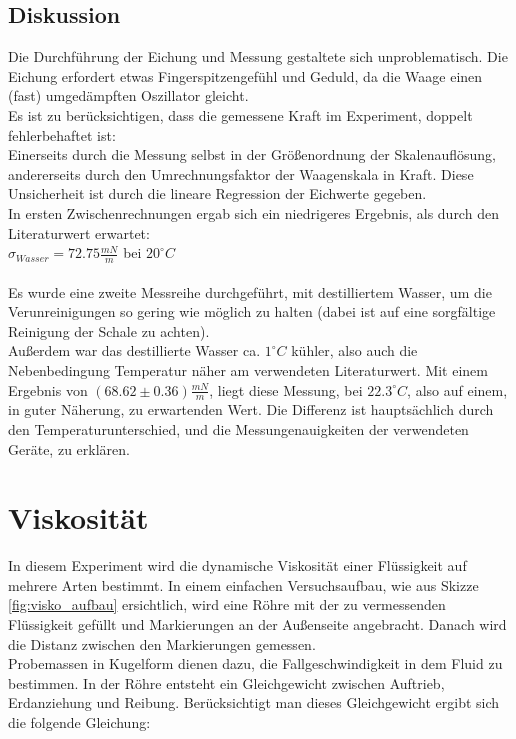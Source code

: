 \documentclass[12pt,a4paper]{article}
\begin{document}
\begin{multicols}{2}
\subsection{Diskussion}
Die Durchführung der Eichung und Messung gestaltete sich unproblematisch. Die Eichung erfordert etwas Fingerspitzengefühl und Geduld, da die Waage einen (fast) umgedämpften Oszillator gleicht.\\
Es ist zu berücksichtigen, dass die gemessene Kraft im Experiment, doppelt fehlerbehaftet ist:\\
Einerseits durch die Messung selbst in der Größenordnung der Skalenauflösung, andererseits durch den Umrechnungsfaktor der Waagenskala in Kraft. Diese Unsicherheit ist durch die lineare Regression der Eichwerte gegeben.\\



In ersten Zwischenrechnungen ergab sich ein niedrigeres Ergebnis, als durch den Literaturwert erwartet:\\
$\sigma_{Wasser} = 72.75 \frac{mN}{m}$ bei $20^{\circ}C$\\
\\
Es wurde eine zweite Messreihe durchgeführt, mit destilliertem Wasser, um die Verunreinigungen so gering wie möglich zu halten (dabei ist auf eine sorgfältige Reinigung der Schale zu achten). \\
Außerdem war das destillierte Wasser ca. $1^{\circ}C$ kühler, also auch die Nebenbedingung Temperatur näher am verwendeten Literaturwert. Mit einem Ergebnis von $(68.62 \pm 0.36) \frac{mN}{m}$,  liegt diese Messung, bei $22.3^{\circ}C$, also auf einem, in guter Näherung, zu erwartenden Wert. Die Differenz ist hauptsächlich durch den Temperaturunterschied, und die Messungenauigkeiten der verwendeten Geräte, zu erklären. 

\section{Viskosität}
In diesem Experiment wird die dynamische Viskosität einer Flüssigkeit auf mehrere Arten bestimmt. In einem einfachen Versuchsaufbau, wie aus Skizze \ref{fig:visko_aufbau} ersichtlich, wird eine Röhre mit der zu vermessenden Flüssigkeit gefüllt und Markierungen an der Außenseite angebracht. Danach wird die Distanz zwischen den Markierungen gemessen. \\
Probemassen in Kugelform dienen dazu, die Fallgeschwindigkeit in dem Fluid zu bestimmen. In der Röhre entsteht ein Gleichgewicht zwischen Auftrieb, Erdanziehung und Reibung. Berücksichtigt man dieses Gleichgewicht ergibt sich die folgende Gleichung:


\end{multicols}
\end{document}
